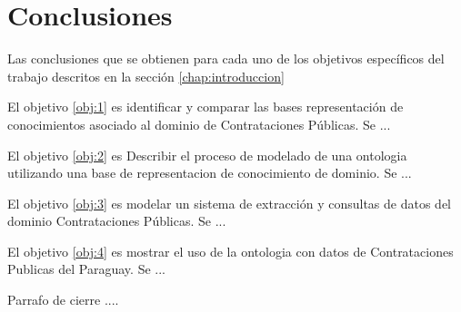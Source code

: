 \section{Conclusiones}
\label{chap:analisis}
Las conclusiones que se obtienen para cada uno de los objetivos específicos del trabajo descritos en la sección \ref{chap:introduccion} 

El objetivo \ref{obj:1} es identificar y comparar las bases representación de conocimientos asociado al dominio de Contrataciones Públicas. Se ...

El objetivo \ref{obj:2} es Describir el proceso de modelado de una ontologia utilizando una base de representacion de conocimiento de dominio. Se ... 

El objetivo \ref{obj:3} es modelar un sistema de extracción y consultas de datos del dominio Contrataciones Públicas. Se ... 

El objetivo \ref{obj:4} es mostrar el uso de la ontologia con datos de Contrataciones Publicas del Paraguay. Se ...

Parrafo de cierre ....